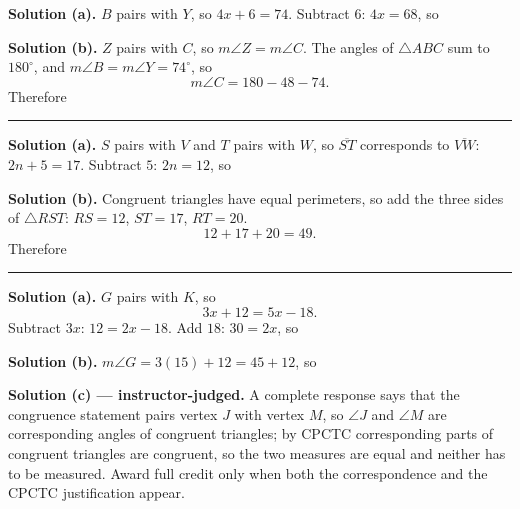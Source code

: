 \documentclass[12pt]{article}
\begin{document}
\noindent\textbf{Solution (a).} $B$ pairs with $Y$, so $4x + 6 = 74$. Subtract
$6$: $4x = 68$, so 

\noindent\textbf{Solution (b).} $Z$ pairs with $C$, so $m\angle Z = m\angle C$.
The angles of $\triangle ABC$ sum to $180^\circ$, and $m\angle B = m\angle Y =
74^\circ$, so
\[ m\angle C = 180 - 48 - 74 .\]
Therefore 

\vspace{0.2cm}\noindent\rule{\linewidth}{0.2pt}


\noindent\textbf{Solution (a).} $S$ pairs with $V$ and $T$ pairs with $W$, so
$\overline{ST}$ corresponds to $\overline{VW}$: $2n + 5 = 17$. Subtract $5$:
$2n = 12$, so 

\noindent\textbf{Solution (b).} Congruent triangles have equal perimeters, so
add the three sides of $\triangle RST$: $RS = 12$, $ST = 17$, $RT = 20$.
\[ 12 + 17 + 20 = 49 .\]
Therefore 

\vspace{0.2cm}\noindent\rule{\linewidth}{0.2pt}


\noindent\textbf{Solution (a).} $G$ pairs with $K$, so
\[ 3x + 12 = 5x - 18 .\]
Subtract $3x$: $12 = 2x - 18$. Add $18$: $30 = 2x$, so 

\noindent\textbf{Solution (b).} $m\angle G = 3(15) + 12 = 45 + 12$, so

\noindent\textbf{Solution (c) --- instructor-judged.} A complete response says
that the congruence statement pairs vertex $J$ with vertex $M$, so $\angle J$
and $\angle M$ are corresponding angles of congruent triangles; by CPCTC
corresponding parts of congruent triangles are congruent, so the two measures
are equal and neither has to be measured. Award full credit only when both the
correspondence and the CPCTC justification appear.
\end{document}
